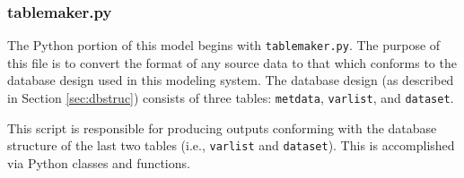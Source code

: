 \subsubsection{table\textunderscore maker.py}
\label{sec:modeltmpy}
The Python portion of this model begins with \texttt{table\textunderscore maker.py}.  
The purpose of this file is to convert the format of any source data to that which conforms to the database design used in this modeling system.  
The database design (as described in Section \ref{sec:dbstruc}) consists of three tables: \texttt{met\textunderscore data}, \texttt{var\textunderscore list}, and \texttt{data\textunderscore set}.  

This script is responsible for producing outputs conforming with the database structure of the last two tables (i.e., \texttt{var\textunderscore list} and \texttt{data\textunderscore set}).  
This is accomplished via Python classes and functions.

